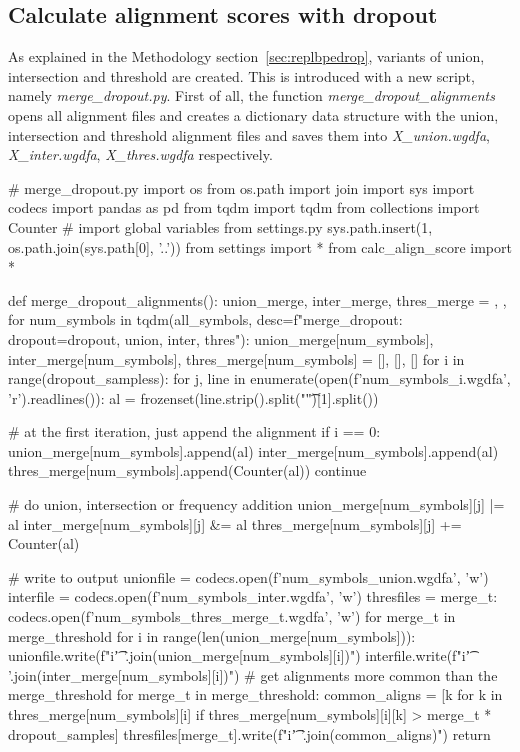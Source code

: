 \subsection{Calculate alignment scores with dropout}

As explained in the Methodology section~\ref{sec:replbpedrop}, variants of union, intersection and threshold are created. This is introduced with a new script, namely \emph{merge\_dropout.py}. First of all, the function \emph{merge\_dropout\_alignments} opens all alignment files and creates a dictionary data structure with the union, intersection and threshold alignment files and saves them into \emph{X\_union.wgdfa}, \emph{X\_inter.wgdfa}, \emph{X\_thres.wgdfa} respectively.

\begin{python}
# merge_dropout.py
import os
from os.path import join
import sys
import codecs
import pandas as pd
from tqdm import tqdm
from collections import Counter
# import global variables from settings.py
sys.path.insert(1, os.path.join(sys.path[0], '..'))
from settings import *
from calc_align_score import *

def merge_dropout_alignments():
  union_merge, inter_merge, thres_merge = {}, {}, {}
  for num_symbols in tqdm(all_symbols, desc=f"merge_dropout: dropout={dropout}, union, inter, thres"):
    union_merge[num_symbols], inter_merge[num_symbols], thres_merge[num_symbols] = [], [], []
    for i in range(dropout_sampless):
      for j, line in enumerate(open(f'{num_symbols}_{i}.wgdfa', 'r').readlines()):
        al = frozenset(line.strip().split("\t")[1].split())

        # at the first iteration, just append the alignment
        if i == 0:
          union_merge[num_symbols].append(al)
          inter_merge[num_symbols].append(al)
          thres_merge[num_symbols].append(Counter(al))
          continue
        
        # do union, intersection or frequency addition
        union_merge[num_symbols][j] |= al
        inter_merge[num_symbols][j] &= al
        thres_merge[num_symbols][j] += Counter(al)

    # write to output
    unionfile = codecs.open(f'{num_symbols}_union.wgdfa', 'w')
    interfile = codecs.open(f'{num_symbols}_inter.wgdfa', 'w')
    thresfiles = {merge_t: codecs.open(f'{num_symbols}_thres_{merge_t}.wgdfa', 'w') for merge_t in merge_threshold}
    for i in range(len(union_merge[num_symbols])):
      unionfile.write(f"{i}\t{' '.join(union_merge[num_symbols][i])}\n")
      interfile.write(f"{i}\t{' '.join(inter_merge[num_symbols][i])}\n")
      # get alignments more common than the merge_threshold %
      for merge_t in merge_threshold:
        common_aligns = [k for k in thres_merge[num_symbols][i] 
                        if thres_merge[num_symbols][i][k] > merge_t * dropout_samples]
        thresfiles[merge_t].write(f"{i}\t{' '.join(common_aligns)}\n")
  return
\end{python}

